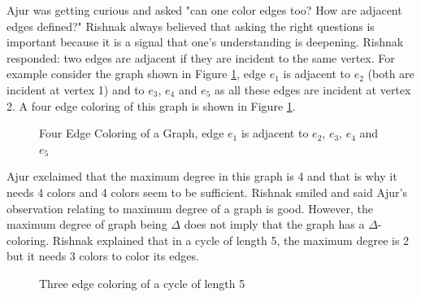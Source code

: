 Ajur was getting curious and asked "can one color edges too? How are adjacent edges defined?"  Rishnak always believed that asking the right questions is important because it is a signal that one's understanding is deepening. Rishnak responded: two edges are adjacent if they are incident to the same vertex. For example consider the graph shown in Figure \ref{10g5},
edge $e_1$ is adjacent to $e_2$ (both are incident at vertex 1) and to $e_3$, $e_4$ and $e_5$ as all these edges are incident at vertex 2. A four edge coloring of this graph is shown in Figure \ref{10g5}. 

\begin{figure}
\begin{center}


\caption{Four Edge Coloring of a Graph, edge $e_1$ is adjacent to $e_2$, $e_3$,
$e_4$ and $e_5$}\label{10g5}
\end{center}
\end{figure}

Ajur exclaimed that the maximum degree in this graph is 4 and that is why it needs 4 colors and 4 colors seem to be sufficient. Rishnak smiled and said Ajur's observation relating to maximum degree of a graph is good. However, the maximum degree of graph being $\Delta$ does not imply that the graph has a $\Delta$-coloring. Rishnak explained that in a cycle of length 5, the maximum degree is 2 but it needs 3 colors to color its edges.

\begin{figure}
\begin{center}


\caption{Three edge coloring of a cycle of length 5 }\label{10g6}
\end{center}
\end{figure}

